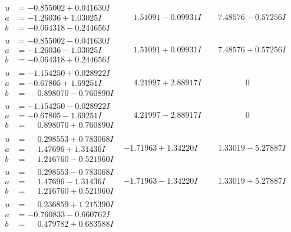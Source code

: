 \documentclass[1p]{elsarticle_modified}
\theoremstyle{definition}
\begin{document}
$$\begin{array}{c|c|c}
\begin{aligned}
u &= -0.855002 + 0.041630 I \\
a &= -1.26036 + 1.03025 I \\
b &= -0.064318 - 0.244656 I\end{aligned}
 & \phantom{-}1.51091 - 0.09931 I & \phantom{-}7.48576 - 0.57256 I \\ \hline\begin{aligned}
u &= -0.855002 - 0.041630 I \\
a &= -1.26036 - 1.03025 I \\
b &= -0.064318 + 0.244656 I\end{aligned}
 & \phantom{-}1.51091 + 0.09931 I & \phantom{-}7.48576 + 0.57256 I \\ \hline\begin{aligned}
u &= -1.154250 + 0.028922 I \\
a &= -0.67805 + 1.69251 I \\
b &= \phantom{-}0.898070 - 0.760890 I\end{aligned}
 & \phantom{-}4.21997 + 2.88917 I & \phantom{-0.000000 } 0 \\ \hline\begin{aligned}
u &= -1.154250 - 0.028922 I \\
a &= -0.67805 - 1.69251 I \\
b &= \phantom{-}0.898070 + 0.760890 I\end{aligned}
 & \phantom{-}4.21997 - 2.88917 I & \phantom{-0.000000 } 0 \\ \hline\begin{aligned}
u &= \phantom{-}0.298553 + 0.783068 I \\
a &= \phantom{-}1.47696 + 1.31436 I \\
b &= \phantom{-}1.216760 - 0.521960 I\end{aligned}
 & -1.71963 + 1.34220 I & \phantom{-}1.33019 - 5.27887 I \\ \hline\begin{aligned}
u &= \phantom{-}0.298553 - 0.783068 I \\
a &= \phantom{-}1.47696 - 1.31436 I \\
b &= \phantom{-}1.216760 + 0.521960 I\end{aligned}
 & -1.71963 - 1.34220 I & \phantom{-}1.33019 + 5.27887 I \\ \hline\begin{aligned}
u &= \phantom{-}0.236859 + 1.215390 I \\
a &= -0.760833 - 0.660762 I \\
b &= \phantom{-}0.479782 + 0.683588 I\end{aligned}

\end{array}$$
\end{document}
